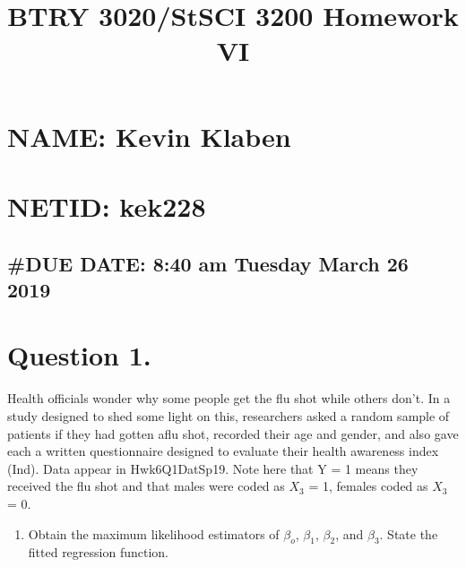 \documentclass[]{article}
\title{BTRY 3020/StSCI 3200 Homework VI}
\author{}
\date{}
\newenvironment{Shaded}{\begin{snugshade}}{\end{snugshade}}
\newcommand{\KeywordTok}[1]{\textcolor[rgb]{0.13,0.29,0.53}{\textbf{#1}}}
\newcommand{\DataTypeTok}[1]{\textcolor[rgb]{0.13,0.29,0.53}{#1}}
\newcommand{\StringTok}[1]{\textcolor[rgb]{0.31,0.60,0.02}{#1}}
\newcommand{\OperatorTok}[1]{\textcolor[rgb]{0.81,0.36,0.00}{\textbf{#1}}}
\newcommand{\NormalTok}[1]{#1}
\providecommand{\tightlist}{%
  \setlength{\itemsep}{0pt}\setlength{\parskip}{0pt}}
\begin{document}
\maketitle

\section{NAME: Kevin Klaben}\label{name-kevin-klaben}

\section{NETID: kek228}\label{netid-kek228}

\subsection{\texorpdfstring{\#\textbf{DUE DATE: 8:40 am Tuesday March 26
2019}}{\#DUE DATE: 8:40 am Tuesday March 26 2019}}\label{due-date-840-am-tuesday-march-26-2019}

\section{Question 1.}\label{question-1.}

Health officials wonder why some people get the flu shot while others
don't. In a study designed to shed some light on this, researchers asked
a random sample of patients if they had gotten aflu shot, recorded their
age and gender, and also gave each a written questionnaire designed to
evaluate their health awareness index (Ind). Data appear in
Hwk6Q1DatSp19. Note here that Y = 1 means they received the flu shot and
that males were coded as \(X_3\) = 1, females coded as \(X_3\) = 0.

\begin{enumerate}
\def\labelenumi{\Alph{enumi})}
\tightlist
\item
  Obtain the maximum likelihood estimators of \(\beta_o\), \(\beta_1\),
  \(\beta_2\), and \(\beta_3\). State the fitted regression function.
\end{enumerate}

\begin{Shaded}
\end{Shaded}
\end{document}
